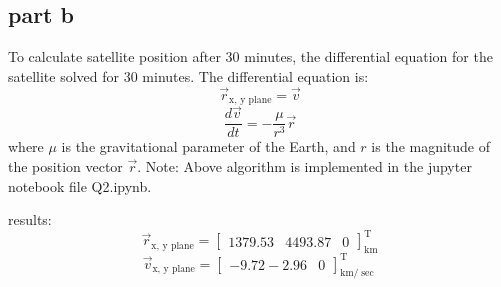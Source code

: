 \subsection{part b}
To calculate satellite position after 30 minutes, the differential equation for the satellite solved for 30 minutes. The differential equation is:
$$
\vec{r}_{\textrm{x, y plane}} = \vec{v}
$$
$$
\frac{d\vec{v}}{dt} = -\frac{\mu}{r^3}\vec{r}
$$
where $\mu$ is the gravitational parameter of the Earth, and $r$ is the magnitude of the position vector $\vec{r}$.
Note: Above algorithm is implemented in the jupyter notebook file Q2.ipynb.

results:
$$
\vec{r}_{\textrm{x, y plane}} = \begin{bmatrix}
    1379.53 & 4493.87 & 0
\end{bmatrix}_{\textrm{km}}^{\textrm{T}}
$$
$$
\vec{v}_{\textrm{x, y plane}} = \begin{bmatrix}
    -9.72 -2.96 & 0
    \end{bmatrix}_{\textrm{km}/\sec}^{\textrm{T}}
$$